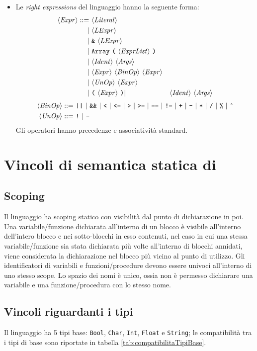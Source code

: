 \begin{itemize}
	\item Le \emph{right expressions} del linguaggio hanno la seguente forma:
	\begin{align*}
	\langle \mathit{Expr} \rangle ::=\ &\langle \mathit{Literal} \rangle\\
	|\ &\langle \mathit{LExpr} \rangle\\
	|\ &\texttt{\&}\ \langle \mathit{LExpr} \rangle\\
	|\ &\texttt{Array}\ \texttt{(}\ \langle \mathit{ExprList} \rangle\ \texttt{)}\\
	|\ &\langle \mathit{Ident} \rangle\ \langle \mathit{Args} \rangle\\
	|\ &\langle \mathit{Expr} \rangle\ \langle \mathit{BinOp} \rangle\ \langle \mathit{Expr} \rangle\\
	|\ &\langle \mathit{UnOp} \rangle\ \langle \mathit{Expr} \rangle\\
	|\ &\texttt{(}\ \langle \mathit{Expr} \rangle\ \texttt{)}
	|\ &\langle \mathit{Ident} \rangle\ \langle \mathit{Args} \rangle\\
	\end{align*}
	\begin{align*}
	\token{BinOp} ::=\ 
	&\texttt{||}\ |\ \texttt{\&\&}\ |\ \texttt{<}\ |\ \texttt{<=}\ |\ \texttt{>}\ |\ \texttt{>=}\ |\ \texttt{==}\ |\  \texttt{!=}\ 
	|\ \texttt{+}\ |\ \texttt{-}\ |\ \texttt{*}\ |\ \texttt{/}\ |\ \texttt{\%}\ |\ \texttt{\^{}} \\
	\token{UnOp} ::=\ &\texttt{!}\ |\ \texttt{-}
	\end{align*}
	Gli operatori hanno precedenze e associatività standard.
\end{itemize}

\section{Vincoli di semantica statica di \SBF}
\subsection*{Scoping}
Il linguaggio ha scoping statico con visibilità dal punto di dichiarazione in poi. Una variabile/funzione dichiarata all'interno di un blocco è visibile all'interno dell'intero blocco e nei sotto-blocchi in esso contenuti, nel caso in cui una stessa variabile/funzione sia stata dichiarata più volte all'interno di blocchi annidati, viene considerata la dichiarazione nel blocco più vicino al punto di utilizzo.
Gli identificatori di variabili e funzioni/procedure devono essere univoci all'interno di uno stesso scope. Lo spazio dei nomi è unico, ossia non è permesso dichiarare una variabile e una funzione/procedura con lo stesso nome. 

\subsection*{Vincoli riguardanti i tipi}
Il linguaggio ha 5 tipi base: \texttt{Bool}, \texttt{Char}, \texttt{Int}, \texttt{Float} e \texttt{String}; le compatibilità tra i tipi di base sono riportate in tabella \ref{tab:compatibilitaTipiBase}. \\

